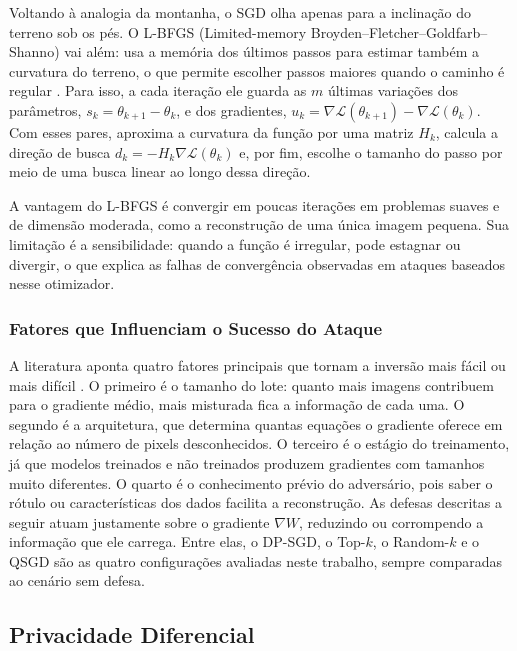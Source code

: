 Voltando à analogia da montanha, o SGD olha apenas para a inclinação do terreno sob os pés. O L-BFGS (Limited-memory Broyden--Fletcher--Goldfarb--Shanno) vai além: usa a memória dos últimos passos para estimar também a curvatura do terreno, o que permite escolher passos maiores quando o caminho é regular \cite{Liu1989}. Para isso, a cada iteração ele guarda as $m$ últimas variações dos parâmetros, $s_k = \theta_{k+1} - \theta_k$, e dos gradientes, $u_k = \nabla \mathcal{L}(\theta_{k+1}) - \nabla \mathcal{L}(\theta_k)$. Com esses pares, aproxima a curvatura da função por uma matriz $H_k$, calcula a direção de busca $d_k = -H_k \nabla \mathcal{L}(\theta_k)$ e, por fim, escolhe o tamanho do passo por meio de uma busca linear ao longo dessa direção.

A vantagem do L-BFGS é convergir em poucas iterações em problemas suaves e de dimensão moderada, como a reconstrução de uma única imagem pequena. Sua limitação é a sensibilidade: quando a função é irregular, pode estagnar ou divergir, o que explica as falhas de convergência observadas em ataques baseados nesse otimizador.

\subsubsection{Fatores que Influenciam o Sucesso do Ataque}

A literatura aponta quatro fatores principais que tornam a inversão mais fácil ou mais difícil \cite{Geiping2020,Huang2021}. O primeiro é o tamanho do lote: quanto mais imagens contribuem para o gradiente médio, mais misturada fica a informação de cada uma. O segundo é a arquitetura, que determina quantas equações o gradiente oferece em relação ao número de pixels desconhecidos. O terceiro é o estágio do treinamento, já que modelos treinados e não treinados produzem gradientes com tamanhos muito diferentes. O quarto é o conhecimento prévio do adversário, pois saber o rótulo ou características dos dados facilita a reconstrução. As defesas descritas a seguir atuam justamente sobre o gradiente $\nabla W$, reduzindo ou corrompendo a informação que ele carrega. Entre elas, o DP-SGD, o Top-$k$, o Random-$k$ e o QSGD são as quatro configurações avaliadas neste trabalho, sempre comparadas ao cenário sem defesa.

\subsection{Privacidade Diferencial} \label{sec:dp}

